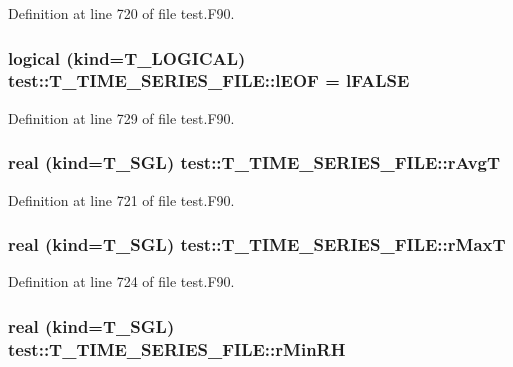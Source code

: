 Definition at line 720 of file test.F90.

\hypertarget{typetest_1_1_t___t_i_m_e___s_e_r_i_e_s___f_i_l_e_af18a995158aea97aae702dd2a0d7bfe5}{
\subsubsection[{lEOF}]{\setlength{\rightskip}{0pt plus 5cm}logical (kind={\bf T\_\-LOGICAL}) {\bf test::T\_\-TIME\_\-SERIES\_\-FILE::lEOF} = {\bf lFALSE}}}
\label{typetest_1_1_t___t_i_m_e___s_e_r_i_e_s___f_i_l_e_af18a995158aea97aae702dd2a0d7bfe5}


Definition at line 729 of file test.F90.

\hypertarget{typetest_1_1_t___t_i_m_e___s_e_r_i_e_s___f_i_l_e_a29183a336282e5d7d79cbe233a956ad6}{
\subsubsection[{rAvgT}]{\setlength{\rightskip}{0pt plus 5cm}real (kind={\bf T\_\-SGL}) {\bf test::T\_\-TIME\_\-SERIES\_\-FILE::rAvgT}}}
\label{typetest_1_1_t___t_i_m_e___s_e_r_i_e_s___f_i_l_e_a29183a336282e5d7d79cbe233a956ad6}


Definition at line 721 of file test.F90.

\hypertarget{typetest_1_1_t___t_i_m_e___s_e_r_i_e_s___f_i_l_e_af487847ca7e5b7ec6130cd41ca895366}{
\subsubsection[{rMaxT}]{\setlength{\rightskip}{0pt plus 5cm}real (kind={\bf T\_\-SGL}) {\bf test::T\_\-TIME\_\-SERIES\_\-FILE::rMaxT}}}
\label{typetest_1_1_t___t_i_m_e___s_e_r_i_e_s___f_i_l_e_af487847ca7e5b7ec6130cd41ca895366}


Definition at line 724 of file test.F90.

\hypertarget{typetest_1_1_t___t_i_m_e___s_e_r_i_e_s___f_i_l_e_a43f6372633d5ab123055a1f67f7a42fc}{
\subsubsection[{rMinRH}]{\setlength{\rightskip}{0pt plus 5cm}real (kind={\bf T\_\-SGL}) {\bf test::T\_\-TIME\_\-SERIES\_\-FILE::rMinRH}}}
\label{typetest_1_1_t___t_i_m_e___s_e_r_i_e_s___f_i_l_e_a43f6372633d5ab123055a1f67f7a42fc}


